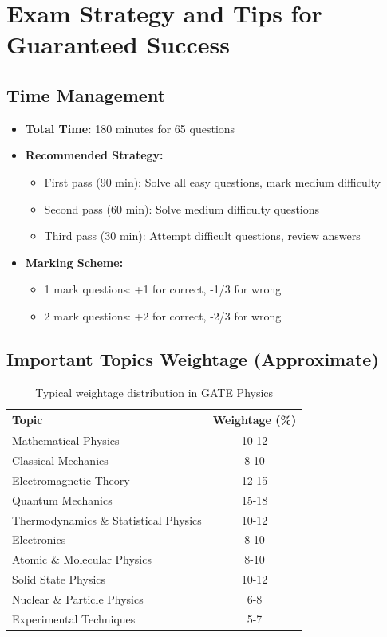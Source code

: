 \documentclass[12pt,a4paper]{article}
\begin{document}
\section{Exam Strategy and Tips for Guaranteed Success}

\subsection{Time Management}

\begin{itemize}
\item \textbf{Total Time:} 180 minutes for 65 questions
\item \textbf{Recommended Strategy:}
  \begin{itemize}
  \item First pass (90 min): Solve all easy questions, mark medium difficulty
  \item Second pass (60 min): Solve medium difficulty questions
  \item Third pass (30 min): Attempt difficult questions, review answers
  \end{itemize}
\item \textbf{Marking Scheme:}
  \begin{itemize}
  \item 1 mark questions: +1 for correct, -1/3 for wrong
  \item 2 mark questions: +2 for correct, -2/3 for wrong
  \end{itemize}
\end{itemize}

\subsection{Important Topics Weightage (Approximate)}

\begin{table}[h]
\centering
\begin{tabular}{@{}lc@{}}
\toprule
\textbf{Topic} & \textbf{Weightage (\%)} \\
\midrule
Mathematical Physics & 10-12 \\
Classical Mechanics & 8-10 \\
Electromagnetic Theory & 12-15 \\
Quantum Mechanics & 15-18 \\
Thermodynamics \& Statistical Physics & 10-12 \\
Electronics & 8-10 \\
Atomic \& Molecular Physics & 8-10 \\
Solid State Physics & 10-12 \\
Nuclear \& Particle Physics & 6-8 \\
Experimental Techniques & 5-7 \\
\bottomrule
\end{tabular}
\caption{Typical weightage distribution in GATE Physics}
\end{table}
\end{document}
